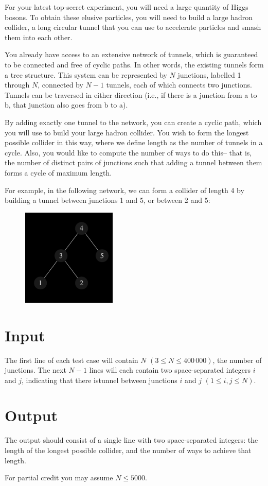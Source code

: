 For your latest top-secret experiment, you will need a large quantity of Higgs bosons. To obtain
these elusive particles, you will need to build a large hadron collider, a long circular tunnel that
you can use to accelerate particles and smash them into each other.

You already have access to an extensive network of tunnels, which is guaranteed to be connected
and free of cyclic paths. In other words, the existing tunnels form a tree structure. This system can
be represented by $N$ junctions, labelled 1 through $N$, connected by $N - 1$ tunnels, each of which
connects two junctions. Tunnels can be traversed in either direction (i.e., if there is a junction from
a to b, that junction also goes from b to a).

By adding exactly one tunnel to the network, you can create a cyclic path, which you will use to
build your large hadron collider. You wish to form the longest possible collider in this way, where
we deﬁne length as the number of tunnels in a cycle. Also, you would like to compute the number of
ways to do this– that is, the number of distinct pairs of junctions such that adding a tunnel
between them forms a cycle of maximum length.

For example, in the following network, we can form a collider of length 4 by building a tunnel
between junctions 1 and 5, or between 2 and 5:
\begin{figure}[h]
    \begin{center}
    \includegraphics[width=0.4\textwidth]{lhc}
    \end{center}
\end{figure}

\section*{Input}
The first line of each test case will contain $N$ $(3 \le N \le 400\,000)$, the number of junctions.
The next $N - 1$ lines will each contain two space-separated integers $i$ and $j$, indicating that there
istunnel between junctions $i$ and $j$ $(1 \le i, j \le N)$.

\section*{Output}
The output should consist of a single line with two space-separated integers: the length of the
longest possible collider, and the number of ways to achieve that length.

For partial credit you may assume $N \le 5 000$.

